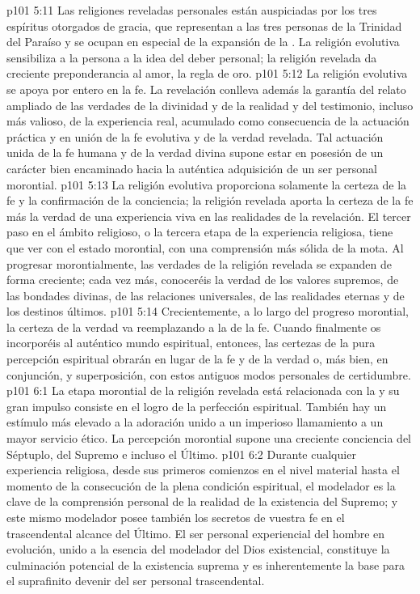 \vs p101 5:11 Las religiones reveladas personales están auspiciadas por los tres espíritus otorgados de gracia, que representan a las tres personas de la Trinidad del Paraíso y se ocupan en especial de la expansión de la . La religión evolutiva sensibiliza a la persona a la idea del deber personal; la religión revelada da creciente preponderancia al amor, la regla de oro.
\vs p101 5:12 La religión evolutiva se apoya por entero en la fe. La revelación conlleva además la garantía del relato ampliado de las verdades de la divinidad y de la realidad y del testimonio, incluso más valioso, de la experiencia real, acumulado como consecuencia de la actuación práctica y en unión de la fe evolutiva y de la verdad revelada. Tal actuación unida de la fe humana y de la verdad divina supone estar en posesión de un carácter bien encaminado hacia la auténtica adquisición de un ser personal morontial.
\vs p101 5:13 \pc La religión evolutiva proporciona solamente la certeza de la fe y la confirmación de la conciencia; la religión revelada aporta la certeza de la fe más la verdad de una experiencia viva en las realidades de la revelación. El tercer paso en el ámbito religioso, o la tercera etapa de la experiencia religiosa, tiene que ver con el estado morontial, con una comprensión más sólida de la mota. Al progresar morontialmente, las verdades de la religión revelada se expanden de forma creciente; cada vez más, conoceréis la verdad de los valores supremos, de las bondades divinas, de las relaciones universales, de las realidades eternas y de los destinos últimos.
\vs p101 5:14 Crecientemente, a lo largo del progreso morontial, la certeza de la verdad va reemplazando a la de la fe. Cuando finalmente os incorporéis al auténtico mundo espiritual, entonces, las certezas de la pura percepción espiritual obrarán en lugar de la fe y de la verdad o, más bien, en conjunción, y superposición, con estos antiguos modos personales de certidumbre.
\vs p101 6:1 La etapa morontial de la religión revelada está relacionada con la  y su gran impulso consiste en el logro de la perfección espiritual. También hay un estímulo más elevado a la adoración unido a un imperioso llamamiento a un mayor servicio ético. La percepción morontial supone una creciente conciencia del Séptuplo, del Supremo e incluso el Último.
\vs p101 6:2 Durante cualquier experiencia religiosa, desde sus primeros comienzos en el nivel material hasta el momento de la consecución de la plena condición espiritual, el modelador es la clave de la comprensión personal de la realidad de la existencia del Supremo; y este mismo modelador posee también los secretos de vuestra fe en el trascendental alcance del Último. El ser personal experiencial del hombre en evolución, unido a la esencia del modelador del Dios existencial, constituye la culminación potencial de la existencia suprema y es inherentemente la base para el suprafinito devenir del ser personal trascendental.
